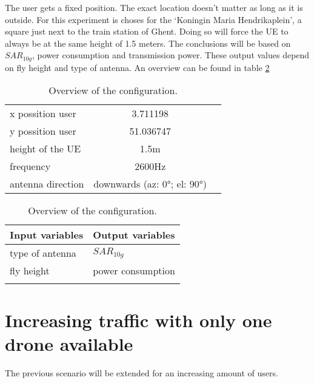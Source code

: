 The user gets a fixed position. The exact location doesn't matter as long as it is outside. For this experiment is choses for the 
`Koningin Maria Hendrikaplein', a square just next to the train station of Ghent.  Doing so will force the \gls{UE} 
to always be at the same height of 1.5 meters. The conclusions will be based on $SAR_{10g}$, power consumption and transmission power.
These output values depend on fly height and type of antenna. An overview can be found in table \ref{table:confOverviewScenario1}

\begin{table}[!htb]
    \begin{minipage}{.5\linewidth}
      \centering
        \begin{tabular}{|l|c|l|}
        \hline
        x possition user               & 3.711198       \\    
        y possition user               & 51.036747          \\ 
        height of the \gls{UE}         & 1.5m                      \\ 
        frequency                      & 2600Hz                   \\ 
        antenna  direction             & downwards (az: \ang{0}; el: \ang{90})    \\ 
        \hline
        \end{tabular}
    \end{minipage}%
    \begin{minipage}{.5\linewidth}
      \centering
            \begin{tabular}{|l|l|}
            \hline
            Input variables                & Output variables          \\   \hline 
            type of antenna                & $SAR_{10g}$               \\ 
            fly height                     & power consumption             \\ 
               &   \\ 
            \hline
            \end{tabular}
    \end{minipage} 
        \caption{Overview of the configuration.}
        \label{table:confOverviewScenario1}
\end{table}




\section{Increasing traffic with only one drone available}
The previous scenario will be extended for an increasing amount of users. 

